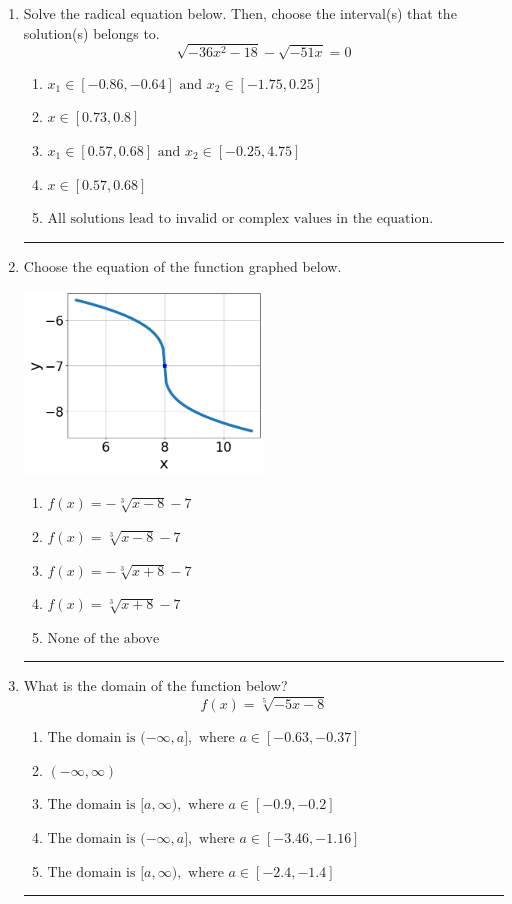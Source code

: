 \documentclass[14pt]{extbook}
\newcommand{\litem}[1]{\item#1\hspace*{-1cm}\rule{\textwidth}{0.4pt}}
\begin{document}
\begin{enumerate}
{\begin{enumerate}[label=\Alph*.]
\end{enumerate} }
\litem{
Solve the radical equation below. Then, choose the interval(s) that the solution(s) belongs to.\[ \sqrt{-36 x^2 - 18} - \sqrt{-51 x} = 0 \]\begin{enumerate}[label=\Alph*.]
\item \( x_1 \in [-0.86, -0.64] \text{ and } x_2 \in [-1.75,0.25] \)
\item \( x \in [0.73,0.8] \)
\item \( x_1 \in [0.57, 0.68] \text{ and } x_2 \in [-0.25,4.75] \)
\item \( x \in [0.57,0.68] \)
\item \( \text{All solutions lead to invalid or complex values in the equation.} \)

\end{enumerate} }
\litem{
Choose the equation of the function graphed below.
\begin{center}
    \includegraphics[width=0.5\textwidth]{../Figures/radicalGraphToEquationCopyB.png}
\end{center}
\begin{enumerate}[label=\Alph*.]
\item \( f(x) = - \sqrt[3]{x - 8} - 7 \)
\item \( f(x) = \sqrt[3]{x - 8} - 7 \)
\item \( f(x) = - \sqrt[3]{x + 8} - 7 \)
\item \( f(x) = \sqrt[3]{x + 8} - 7 \)
\item \( \text{None of the above} \)

\end{enumerate} }
\litem{
What is the domain of the function below?\[ f(x) = \sqrt[5]{-5 x - 8} \]\begin{enumerate}[label=\Alph*.]
\item \( \text{The domain is } (-\infty, a], \text{   where } a \in [-0.63, -0.37] \)
\item \( (-\infty, \infty) \)
\item \( \text{The domain is } [a, \infty), \text{   where } a \in [-0.9, -0.2] \)
\item \( \text{The domain is } (-\infty, a], \text{   where } a \in [-3.46, -1.16] \)
\item \( \text{The domain is } [a, \infty), \text{   where } a \in [-2.4, -1.4] \)


\end{enumerate}}
\end{enumerate}
\end{document}
